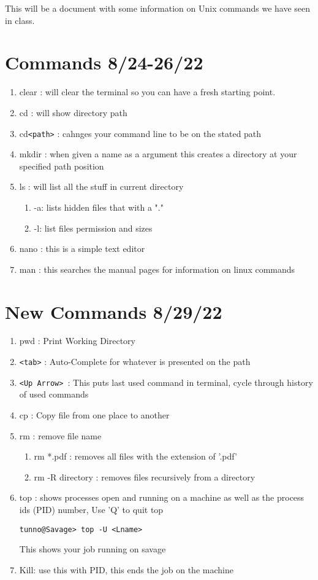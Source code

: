 \documentclass[12pt]{article}
\begin{document}
This will be a document with some information on Unix commands we have seen in class.

\section{Commands 8/24-26/22}
\begin{enumerate}
\item clear           : will clear the terminal so you can have a fresh starting point.
\item cd              : will show directory path
\item cd\verb'<path>' : cahnges your command line to be on the stated path
\item mkdir           : when given a name as a argument this creates a directory at your specified path position
\item ls              : will list all the stuff in current directory
	\begin{enumerate}
		\item -a: lists hidden files that with a "."
		\item -l: list files permission and sizes
	\end{enumerate}

\item nano            : this is a simple text editor
\item man             : this searches the manual pages for information on linux commands
\end{enumerate}


\section{New Commands 8/29/22}
\begin{enumerate}
  \item pwd               : Print Working Directory
  \item \verb'<tab>'      : Auto-Complete for whatever is presented on the path
  \item \verb'<Up Arrow> ': This puts last used command in terminal, cycle through history of used commands
  \item cp                : Copy file from one place to another
  \item rm                : remove file name
  \begin{enumerate}
    \item rm *.pdf         : removes all files with the extension of '.pdf'
    \item rm -R directory  : removes files recursively from a directory
  \end{enumerate}

\item top              : shows processes open and running on a machine as well as the process ids (PID) number, Use 'Q' to quit top
\begin{verbatim}
tunno@Savage> top -U <Lname>
\end{verbatim}
This shows your job running on savage
\item Kill: use this with PID, this ends the job on the machine
\end{enumerate}
\end{document}
